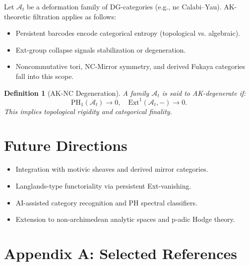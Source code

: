 \documentclass[11pt]{article}
\newtheorem{definition}[theorem]{Definition}
\begin{document}
Let \( \mathcal{A}_t \) be a deformation family of DG-categories (e.g., nc Calabi–Yau).  
AK-theoretic filtration applies as follows:

\begin{itemize}
    \item Persistent barcodes encode categorical entropy (topological vs. algebraic).
    \item Ext-group collapse signals stabilization or degeneration.
    \item Noncommutative tori, NC-Mirror symmetry, and derived Fukaya categories fall into this scope.
\end{itemize}

\begin{definition}[AK-NC Degeneration]
A family \( \mathcal{A}_t \) is said to AK-degenerate if:
\[
\mathrm{PH}_1(\mathcal{A}_t) \to 0, \quad \mathrm{Ext}^1(\mathcal{A}_t, -) \to 0.
\]
This implies topological rigidity and categorical finality.
\end{definition}


\section{Future Directions}

\begin{itemize}
    \item Integration with motivic sheaves and derived mirror categories.
    \item Langlands-type functoriality via persistent Ext-vanishing.
    \item AI-assisted category recognition and PH spectral classifiers.
    \item Extension to non-archimedean analytic spaces and p-adic Hodge theory.
\end{itemize}



\section*{Appendix A: Selected References}
\end{document}
